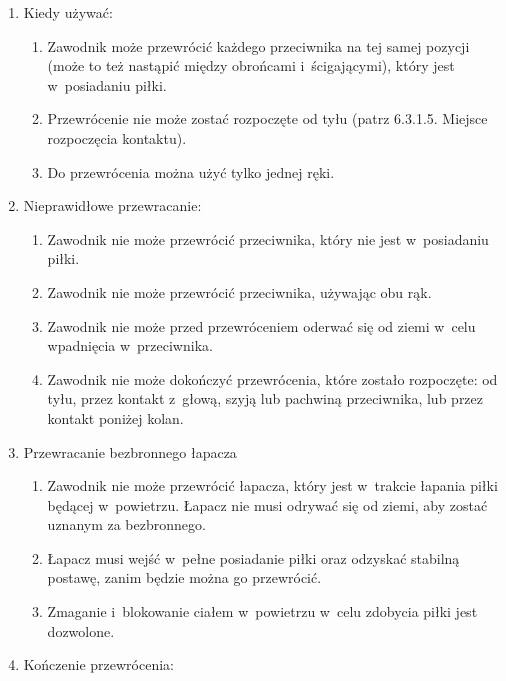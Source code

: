 \documentclass[12pt,a4paper]{article}
\begin{document}
\begin{enumerate}
	\item
	      Kiedy używać:

	      \begin{enumerate}
		      \item
		            Zawodnik może przewrócić każdego przeciwnika na tej samej pozycji
		            (może to też nastąpić między obrońcami i~ścigającymi), który jest w~posiadaniu piłki.
		      \item
		            Przewrócenie nie może zostać rozpoczęte od tyłu (patrz 6.3.1.5.
		            Miejsce rozpoczęcia kontaktu).
		      \item
		            Do przewrócenia można użyć tylko jednej ręki.
	      \end{enumerate}
	\item
	      Nieprawidłowe przewracanie:

	      \begin{enumerate}
		      \item
		            Zawodnik nie może przewrócić przeciwnika, który nie jest w~posiadaniu piłki.
		      \item
		            Zawodnik nie może przewrócić przeciwnika, używając obu rąk.
		      \item
		            Zawodnik nie może przed przewróceniem oderwać się od ziemi w~celu
		            wpadnięcia w~przeciwnika.
		      \item
		            Zawodnik nie może dokończyć przewrócenia, które zostało rozpoczęte:
		            od tyłu, przez kontakt z~głową, szyją lub pachwiną przeciwnika, lub
		            przez kontakt poniżej kolan.
	      \end{enumerate}
	\item
	      Przewracanie bezbronnego łapacza

	      \begin{enumerate}
		      \item
		            Zawodnik nie może przewrócić łapacza, który jest w~trakcie łapania
		            piłki będącej w~powietrzu. Łapacz nie musi odrywać się od ziemi, aby
		            zostać uznanym za bezbronnego.
		      \item
		            Łapacz musi wejść w~pełne posiadanie piłki oraz odzyskać stabilną
		            postawę, zanim będzie można go przewrócić.
		      \item
		            Zmaganie i~blokowanie ciałem w~powietrzu w~celu zdobycia piłki jest
		            dozwolone.
	      \end{enumerate}
	\item
	      Kończenie przewrócenia:


\end{enumerate}
\end{document}
